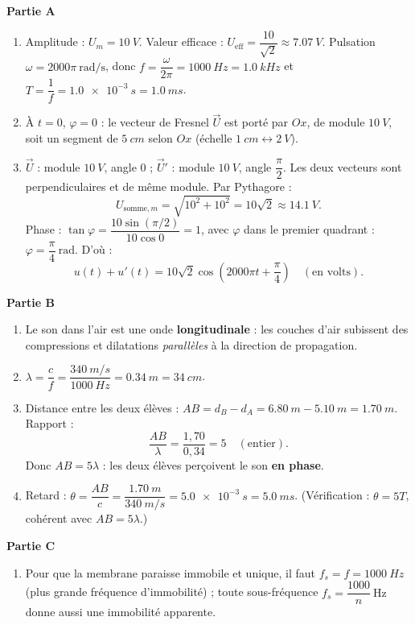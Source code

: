 \documentclass[11pt]{article}
\begin{document}
\begin{corrige}
\textbf{Partie A}
\begin{enumerate}
\item Amplitude : $U_m = \SI{10}{V}$. Valeur efficace : $U_{\text{eff}} = \dfrac{10}{\sqrt{2}} \approx \SI{7,07}{V}$. Pulsation $\omega = 2000\pi\ \text{rad/s}$, donc $f = \dfrac{\omega}{2\pi} = \SI{1000}{Hz} = \SI{1,0}{kHz}$ et $T = \dfrac{1}{f} = \SI{1,0e-3}{s} = \SI{1,0}{ms}$.
\item À $t = 0$, $\varphi = 0$ : le vecteur de Fresnel $\vec{U}$ est porté par $Ox$, de module $\SI{10}{V}$, soit un segment de $\SI{5}{cm}$ selon $Ox$ (échelle $\SI{1}{cm} \leftrightarrow \SI{2}{V}$).
\item $\vec{U}$ : module $\SI{10}{V}$, angle $0$ ; $\vec{U}'$ : module $\SI{10}{V}$, angle $\dfrac{\pi}{2}$. Les deux vecteurs sont perpendiculaires et de même module. Par Pythagore :
\[ U_{\text{somme},m} = \sqrt{10^2 + 10^2} = 10\sqrt{2} \approx \SI{14,1}{V}. \]
Phase : $\tan\varphi = \dfrac{10\sin(\pi/2)}{10\cos 0} = 1$, avec $\varphi$ dans le premier quadrant : $\varphi = \dfrac{\pi}{4}\ \text{rad}$. D'où :
\[ u(t) + u'(t) = 10\sqrt{2}\cos\left(2000\pi t + \frac{\pi}{4}\right) \quad (\text{en volts}). \]
\end{enumerate}
\textbf{Partie B}
\begin{enumerate}
\item Le son dans l'air est une onde \textbf{longitudinale} : les couches d'air subissent des compressions et dilatations \emph{parallèles} à la direction de propagation.
\item $\lambda = \dfrac{c}{f} = \dfrac{\SI{340}{m/s}}{\SI{1000}{Hz}} = \SI{0,34}{m} = \SI{34}{cm}$.
\item Distance entre les deux élèves : $AB = d_B - d_A = \SI{6,80}{m} - \SI{5,10}{m} = \SI{1,70}{m}$. Rapport :
\[ \frac{AB}{\lambda} = \frac{1,70}{0,34} = 5 \quad (\text{entier}). \]
Donc $AB = 5\lambda$ : les deux élèves perçoivent le son \textbf{en phase}.
\item Retard : $\theta = \dfrac{AB}{c} = \dfrac{\SI{1,70}{m}}{\SI{340}{m/s}} = \SI{5,0e-3}{s} = \SI{5,0}{ms}$. (Vérification : $\theta = 5T$, cohérent avec $AB = 5\lambda$.)
\end{enumerate}
\textbf{Partie C}
\begin{enumerate}
\item Pour que la membrane paraisse immobile et unique, il faut $f_s = f = \SI{1000}{Hz}$ (plus grande fréquence d'immobilité) ; toute sous-fréquence $f_s = \dfrac{1000}{n}\ \text{Hz}$ donne aussi une immobilité apparente.

\end{enumerate}
\end{corrige}
\end{document}

